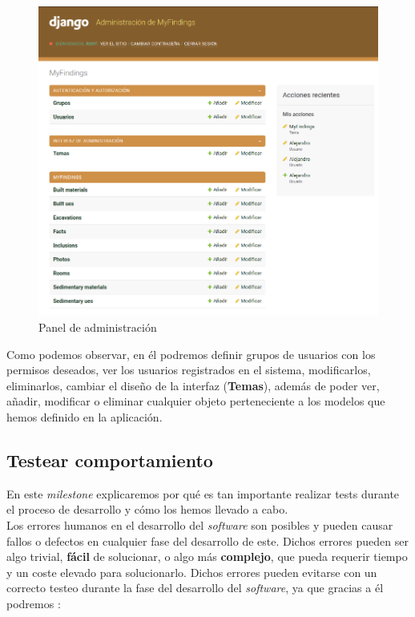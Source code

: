     \begin{figure}[H]
        \centering
        \includegraphics[scale=0.32]{imagenes/admin-interface.png}
        \caption{Panel de administración}
        \label{fig:admin-interface}
    \end{figure}

Como podemos observar, en él podremos definir grupos de usuarios con los permisos deseados,
ver los usuarios registrados en el sistema, modificarlos, eliminarlos, cambiar el diseño
de la interfaz (\textbf{Temas}), además de poder ver, añadir, modificar o eliminar
cualquier objeto perteneciente a los modelos que hemos definido en la aplicación.


\subsection{Testear comportamiento}
En este \textit{milestone} explicaremos por qué es tan importante realizar tests
durante el proceso de desarrollo y cómo los hemos llevado a cabo.\\

Los errores humanos en el desarrollo del \textit{software} son posibles y pueden causar
fallos o defectos en cualquier fase del desarrollo de este. Dichos errores pueden ser algo
trivial, \textbf{fácil} de solucionar, o algo más \textbf{complejo}, que pueda requerir
tiempo y un coste elevado para solucionarlo. Dichos errores pueden evitarse con un correcto
testeo durante la fase del desarrollo del \textit{software}, ya que gracias a él
podremos \cite{why-testing}:

